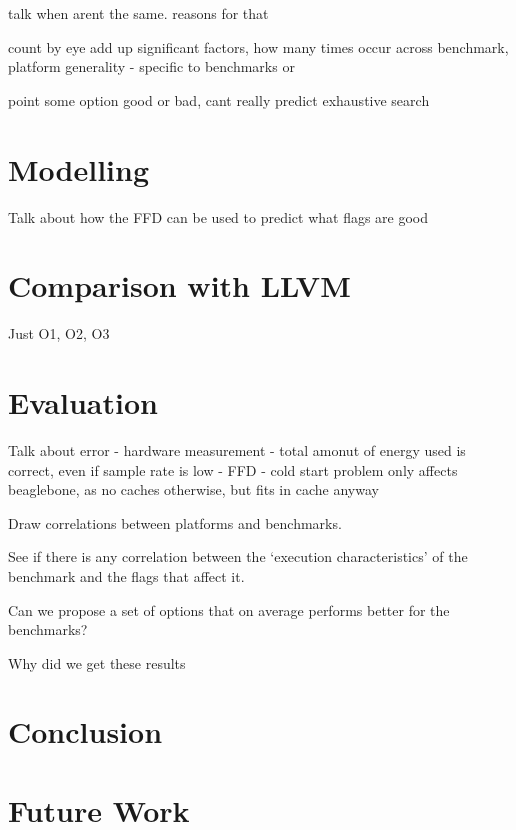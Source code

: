 \documentclass[twocolumn]{article}
\begin{document}
talk when arent the same.
reasons for that


count
by eye add up significant factors, how many times occur across benchmark, platform
generality - specific to benchmarks or

point some option good or bad, cant really predict
exhaustive search

\section*{Modelling}

Talk about how the FFD can be used to predict what flags are good

\section*{Comparison with LLVM}

Just O1, O2, O3


\section*{Evaluation}

Talk about error
 - hardware measurement
 - total amonut of energy used is correct, even if sample rate is low
 - FFD
 - cold start problem
 	only affects beaglebone, as no caches otherwise, but fits in cache anyway


Draw correlations between platforms and benchmarks.

See if there is any correlation between the `execution characteristics' of the benchmark and the flags that affect it.

Can we propose a set of options that on average performs better for the benchmarks?

Why did we get these results


\section*{Conclusion}

\section*{Future Work}

\printbibliography
\end{document}

